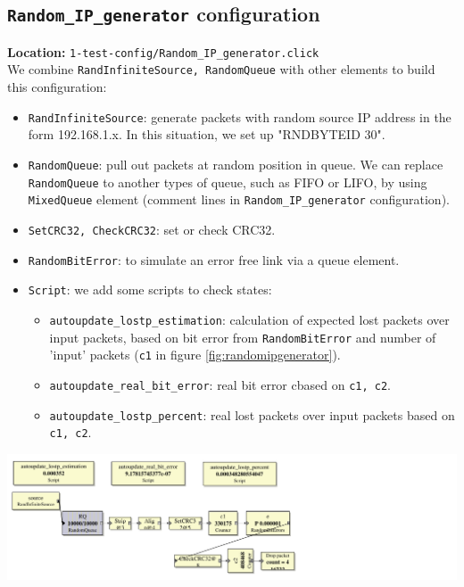 \documentclass[a4paper]{article}
\begin{document}
  \subsection{\texttt{Random\_IP\_generator} configuration}
  \textbf{Location:} \texttt{1-test-config/Random\_IP\_generator.click} \\
  We combine \texttt{RandInfiniteSource, RandomQueue} with other elements to build this configuration:
  \begin{itemize}
   	\item \texttt{RandInfiniteSource}: generate packets with random source IP address in the form 192.168.1.x. In this situation, we set up "RNDBYTEID 30".
   	\item \texttt{RandomQueue}: pull out packets at random position in queue. We can replace \texttt{RandomQueue} to another types of queue, such as FIFO or LIFO, by using \texttt{MixedQueue} element (comment lines in \texttt{Random\_IP\_generator} configuration). 
   	\item \texttt{SetCRC32, CheckCRC32}: set or check CRC32.
   	\item \texttt{RandomBitError}: to simulate an error free link via a queue element.
   	\item \texttt{Script}: we add some scripts to check states: 
       	\begin{itemize}
       		\item \texttt{autoupdate\_lostp\_estimation}: calculation of expected lost packets over input packets, based on bit error from \texttt{RandomBitError} and number of 'input' packets (\texttt{c1} in figure \ref{fig:randomipgenerator}).
       		\item \texttt{autoupdate\_real\_bit\_error}: real bit error cbased on \texttt{c1, c2}. 
       		\item \texttt{autoupdate\_lostp\_percent}: real lost packets over input packets based on \texttt{c1, c2}.
       	\end{itemize}
   \end{itemize} 
  \begin{center}
	  \includegraphics[scale=0.55]{Random_IP_generator.pdf}
	  \label{fig:randomipgenerator}
  \end{center}
\end{document}
